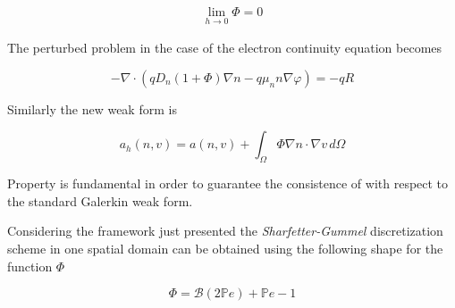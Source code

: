 \begin{align}
\label{eq: consistenza}
\lim_{h \to 0} \Phi = 0
\end{align}

The perturbed problem in the case of the electron continuity equation becomes

\begin{equation}
\label{eq: perturbed problem}
- \nabla \cdot (qD_n(1+\Phi)\nabla n - q \mu_n n \nabla \varphi) = -qR
\end{equation}

Similarly the new weak form is

\begin{equation}
\label{eq: weak form perturbed}
a_h(n,v) = a(n,v) + \int_{\Omega} \Phi \nabla n \cdot \nabla v \, d\Omega
\end{equation}

Property  is fundamental in order to guarantee the consistence of  with respect to the standard Galerkin weak form.

Considering the framework just presented the \textit{Sharfetter-Gummel} discretization scheme in one spatial domain can be obtained using the following shape for the function $\Phi$

\begin{equation}
\label{eq: phi per SG 1D}
\Phi = \mathcal{B}(2\mathbb{P}e) + \mathbb{P}e -1
\end{equation}

